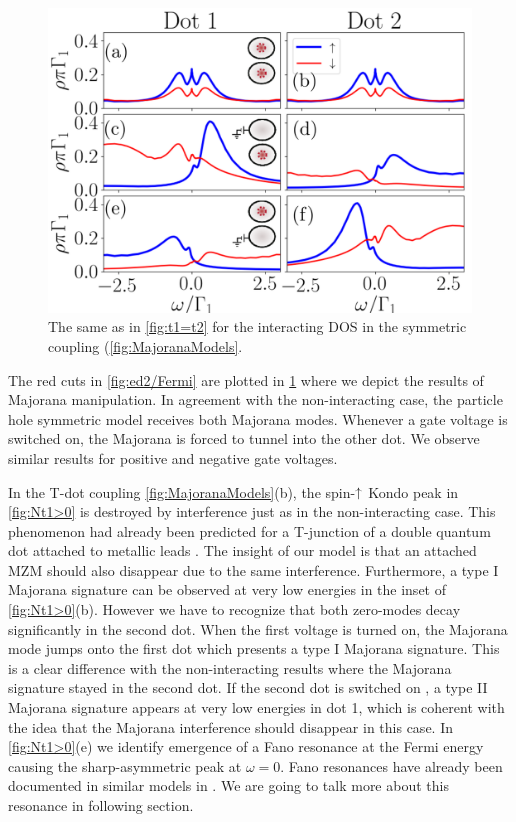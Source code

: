 \begin{figure}[bt]
\begin{center}
\includegraphics[scale=0.5]{IMAGES/NRG/t1=t2.png}
\caption{ \label{fig:Nt1=t2} The same as in \ref{fig:t1=t2} for the  interacting DOS in the symmetric coupling  (\ref{fig:MajoranaModels}.\protect\Source{}
}
%
\end{center}
\end{figure}

    The red cuts in \ref{fig:ed2/Fermi} are plotted in \ref{fig:Nt1=t2} where we depict the results of Majorana manipulation. In agreement with the non-interacting case, the particle hole symmetric model receives both Majorana modes. Whenever a gate voltage is switched on, the Majorana is forced to tunnel into the other dot. We observe similar results for positive and negative gate voltages. 

 
 In the T-dot coupling \ref{fig:MajoranaModels}(b), the spin-$\uparrow$ Kondo peak in  \ref{fig:Nt1>0} is destroyed by interference just as in the non-interacting case. This phenomenon had already been predicted for a T-junction of a double quantum dot attached to metallic leads \cite{dias_da_silva_transmission_2008}. The insight of our model is that an attached MZM should also disappear due to the same interference. Furthermore, a type I Majorana signature can be observed at very low energies in the inset of \ref{fig:Nt1>0}(b). However we have to recognize that both zero-modes decay significantly in the second dot. When the first voltage is turned on, the Majorana mode jumps onto the first dot which presents a type I Majorana signature. This is a clear difference with the non-interacting results where the Majorana signature stayed in the second dot.  If the second dot is switched on , a type II Majorana signature appears at very low energies in dot 1, which is coherent with the idea that the Majorana interference should disappear in this case. In \ref{fig:Nt1>0}(e) we identify emergence of a Fano resonance at the Fermi energy causing the sharp-asymmetric peak at $\omega = 0$. Fano resonances have already been documented in similar models in \cite{schuray_fano_2017}. We are going to talk more about this resonance in following section. 



